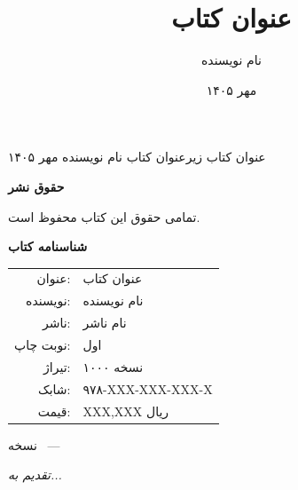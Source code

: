 \documentclass{matinbook}
\title{عنوان کتاب}
\author{نام نویسنده}
\date{مهر ۱۴۰۵}
\begin{document}
\makecover
    {عنوان کتاب}
    {زیرعنوان کتاب}
    {نام نویسنده}
    {مهر ۱۴۰۵}

\frontmatter
\frontmattergeometry

\maketitle

\thispagestyle{empty}
\vfill
\begin{center}
    {\large\textbf{حقوق نشر}}
    
    \vspace{1cm}
    تمامی حقوق این کتاب محفوظ است.
    
    \vspace{1cm}
    \textbf{شناسنامه کتاب}
    
    \vspace{0.5cm}
    \begin{tabular}{rl}
        عنوان: & عنوان کتاب \\
        نویسنده: & نام نویسنده \\
        ناشر: & نام ناشر \\
        نوبت چاپ: & اول \\
        تیراژ: & ۱۰۰۰ نسخه \\
        شابک: & ۹۷۸-XXX-XXX-XXX-X \\
        قیمت: & XXX,XXX ریال \\
    \end{tabular}
    
    \vspace{1cm}
    {\small نسخه \matinbookversion\ — \matinbookdate}
\end{center}
\clearpage

\thispagestyle{empty}
\vfill
\begin{flushright}
    {\Large\itshape
        تقدیم به...
    }
\end{flushright}
\clearpage
\end{document}

